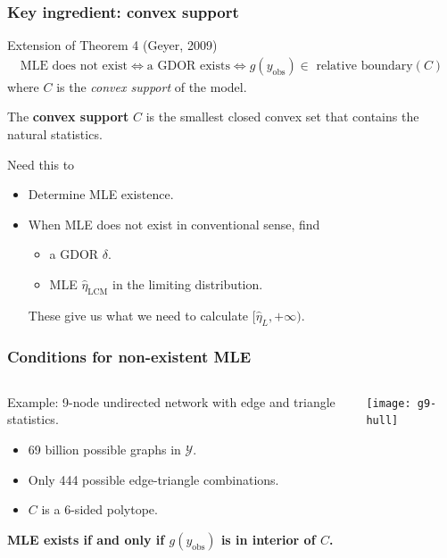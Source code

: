 \documentclass[slidestop,compress, 10pt]{beamer}
\def\YY{{\mathcal Y}}
\newcommand{\etaLCM}{\hat{\eta}_{\textrm{LCM}}}
\newcommand{\yobs}{y_{\text{obs}}}
\begin{document}
\frame
{
  \frametitle{Key ingredient: convex support}  
\begin{block}{Extension of Theorem 4 (Geyer, 2009)}
\begin{align*}
\text{MLE does not exist} \iff \text{a GDOR exists} \iff \text{$g(\yobs) \in$ relative boundary$(C)$}
\end{align*}
where  $C$ is the \emph{convex support} of the model.
\end{block}
\vspace{2mm}

The \textbf{convex support} $C$ is the smallest closed convex set that contains the natural statistics.
\vspace{2mm}

\pause
Need this to
\begin{itemize}
\item Determine MLE existence.
\item When MLE does not exist in conventional sense, find
\begin{itemize}
	\item	a GDOR $\delta$.
	\item 	MLE $\etaLCM$ in the limiting distribution.
\end{itemize}
	These give us what we need to calculate $[\hat{\eta}_L, +\infty)$.
\end{itemize}

}

\frame
{
  \frametitle{Conditions for non-existent MLE}  

\begin{columns}[T]
\begin{column}[T]{0.4\textwidth}

{
Example: 9-node undirected network with edge and triangle statistics.
\vspace{1mm}

\begin{itemize}
\item 69 billion possible graphs in $\YY$.
\item Only 444 possible edge-triangle combinations.
\item $C$ is a 6-sided polytope.
\end{itemize}
\vspace{2mm}

\textbf{MLE exists if and only if
$g(\yobs)$ is in interior of $C$.}
}
\end{column}
\begin{column}[T]{0.6\textwidth}
\texttt{[image: g9-hull]}
\end{column}
\end{columns}
}
\end{document}
